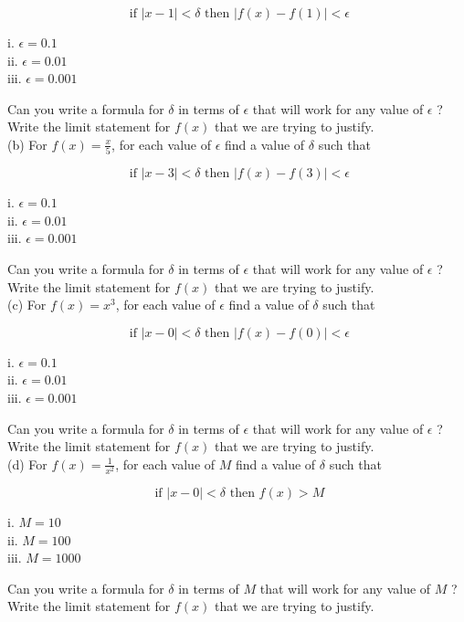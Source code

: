 \documentclass[10pt]{article}
\begin{document}
$$
\text { if }|x-1|<\delta \text { then }|f(x)-f(1)|<\epsilon
$$

i. $\epsilon=0.1$\\
ii. $\epsilon=0.01$\\
iii. $\epsilon=0.001$

Can you write a formula for $\delta$ in terms of $\epsilon$ that will work for any value of $\epsilon$ ? Write the limit statement for $f(x)$ that we are trying to justify.\\
(b) For $f(x)=\frac{x}{5}$, for each value of $\epsilon$ find a value of $\delta$ such that

$$
\text { if }|x-3|<\delta \text { then }|f(x)-f(3)|<\epsilon
$$

i. $\epsilon=0.1$\\
ii. $\epsilon=0.01$\\
iii. $\epsilon=0.001$

Can you write a formula for $\delta$ in terms of $\epsilon$ that will work for any value of $\epsilon$ ? Write the limit statement for $f(x)$ that we are trying to justify.\\
(c) For $f(x)=x^{3}$, for each value of $\epsilon$ find a value of $\delta$ such that

$$
\text { if }|x-0|<\delta \text { then }|f(x)-f(0)|<\epsilon
$$

i. $\epsilon=0.1$\\
ii. $\epsilon=0.01$\\
iii. $\epsilon=0.001$

Can you write a formula for $\delta$ in terms of $\epsilon$ that will work for any value of $\epsilon$ ? Write the limit statement for $f(x)$ that we are trying to justify.\\
(d) For $f(x)=\frac{1}{x^{2}}$, for each value of $M$ find a value of $\delta$ such that

$$
\text { if }|x-0|<\delta \text { then } f(x)>M
$$

i. $M=10$\\
ii. $M=100$\\
iii. $M=1000$

Can you write a formula for $\delta$ in terms of $M$ that will work for any value of $M$ ? Write the limit statement for $f(x)$ that we are trying to justify.
\end{document}
